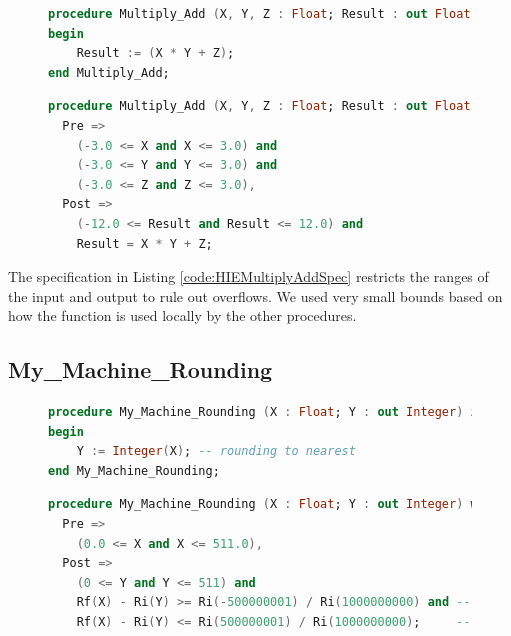 \documentclass[runningheads]{llncs}
\begin{document}
\begin{figure}[t]
\vspace{-2ex}
\begin{lstlisting}[caption=Multiply\_Add Implementation, language=ada, label={code:HIEMultiplyAddImpl},basicstyle=\fontsize{7.5}{9pt}\tt]
procedure Multiply_Add (X, Y, Z : Float; Result : out Float) is
begin
    Result := (X * Y + Z);
end Multiply_Add;
\end{lstlisting}
  
\begin{lstlisting}[caption=Multiply\_Add Specification, language=ada, label={code:HIEMultiplyAddSpec},basicstyle=\fontsize{7.5}{9pt}\tt]
  procedure Multiply_Add (X, Y, Z : Float; Result : out Float) with
  Pre => 
    (-3.0 <= X and X <= 3.0) and
    (-3.0 <= Y and Y <= 3.0) and
    (-3.0 <= Z and Z <= 3.0),
  Post =>
    (-12.0 <= Result and Result <= 12.0) and
    Result = X * Y + Z;
\end{lstlisting}
\vspace{-2ex}
\end{figure}

The specification in Listing \ref{code:HIEMultiplyAddSpec} restricts the ranges of the input and output to rule out overflows.
We used very small bounds based on how the function is used locally by the other procedures.


\subsection{My\_Machine\_Rounding}

\begin{figure}[tb]
\vspace{-2ex}
\begin{lstlisting}[caption=My\_Machine\_Rounding Implementation, language=ada, label={code:HIERoundingImpl},basicstyle=\fontsize{7.5}{9pt}\tt]
procedure My_Machine_Rounding (X : Float; Y : out Integer) is
begin
    Y := Integer(X); -- rounding to nearest
end My_Machine_Rounding;
\end{lstlisting}
  
\begin{lstlisting}[caption=My\_Machine\_Rounding Specification, language=ada, label={code:HIERoundingSpec},basicstyle=\fontsize{7.5}{9pt}\tt]
procedure My_Machine_Rounding (X : Float; Y : out Integer) with
  Pre =>
    (0.0 <= X and X <= 511.0),
  Post =>
    (0 <= Y and Y <= 511) and
    Rf(X) - Ri(Y) >= Ri(-500000001) / Ri(1000000000) and -- -0.500000001
    Rf(X) - Ri(Y) <= Ri(500000001) / Ri(1000000000);     --  0.500000001
\end{lstlisting}
\vspace{-2ex}
\end{figure}
\end{document}
